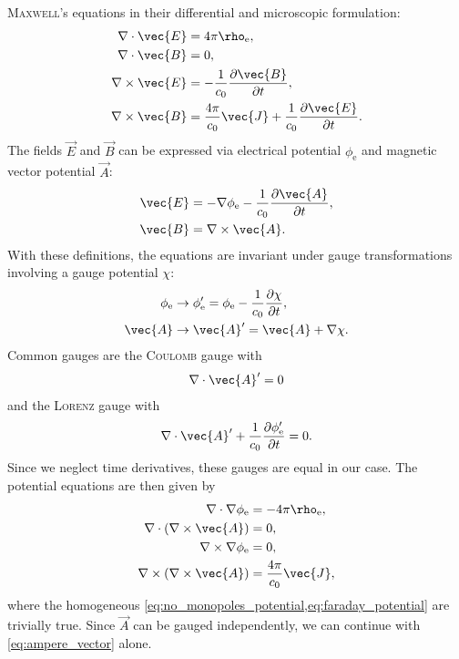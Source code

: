 \textsc{Maxwell}'s equations in their differential and microscopic formulation:
\begin{align}
  \divg \vec{E} &= 4 \pi \rho_{\text{e}}, \label{eq:gauss_field} \\
  \divg \vec{B} &= 0, \label{eq:no_monopoles_field} \\
  \curl \vec{E} &= -\frac{1}{c_{0}} \pd[\vec{B}]{t}, \label{eq:faraday_field} \\
  \curl \vec{B} &= \frac{4 \pi}{c_{0}} \vec{J} + \frac{1}{c_{0}} \pd[\vec{E}]{t}. \label{eq:ampere_field}
\end{align}
The fields $\vec{E}$ and $\vec{B}$ can be expressed via electrical potential $\phi_{\text{e}}$ and magnetic vector potential $\vec{A}$:
\begin{align}
  \vec{E} &= -\grad \phi_{\text{e}} - \frac{1}{c_{0}} \pd[\vec{A}]{t}, \label{eq:electric_field} \\
  \vec{B} &= \curl \vec{A}. \label{eq:magnetic_field}
\end{align}
With these definitions, the equations are invariant under gauge transformations involving a gauge potential $\chi$:
\begin{align*}
  \phi_{\text{e}} &\to \phi_{\text{e}}' = \phi_{\text{e}} - \frac{1}{c_{0}} \pd[\chi]{t}, \\
  \vec{A} &\to \vec{A}' = \vec{A} + \grad \chi.
\end{align*}
Common gauges are the \textsc{Coulomb} gauge with
\begin{gather*}
  \divg \vec{A}' = 0
\end{gather*}
and the \textsc{Lorenz} gauge with
\begin{gather*}
  \divg \vec{A}' + \frac{1}{c_{0}} \pd[\phi_{\text{e}}']{t} = 0.
\end{gather*}
Since we neglect time derivatives, these gauges are equal in our case. The potential equations are then given by
\begin{align}
  \divg \nabla \phi_{\text{e}} &= -4 \pi \rho_{\text{e}}, \label{eq:gauss_potential} \\
  \divg (\curl \vec{A}) &= 0, \label{eq:no_monopoles_potential} \\
  \curl \nabla \phi_{\text{e}} &= 0, \label{eq:faraday_potential} \\
  \curl (\curl \vec{A}) &= \frac{4 \pi}{c_{0}} \vec{J}, \label{eq:ampere_vector}
\end{align}
where the homogeneous \cref{eq:no_monopoles_potential,eq:faraday_potential} are trivially true. Since $\vec{A}$ can be gauged independently, we can continue with \cref{eq:ampere_vector} alone.

